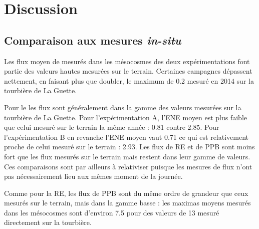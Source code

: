 \section{Discussion}

\subsection{Comparaison aux mesures \textit{in-situ}}

Les flux moyen de \chh mesurés dans les mésocosmes des deux expérimentations font partie des valeurs hautes mesurées sur le terrain.
Certaines campagnes dépassent nettement, en faisant plus que doubler, le maximum de \SI{0.2}{\uml} mesuré en 2014 sur la tourbière de La Guette.

Pour le \coo les flux sont généralement dans la gamme des valeurs mesurées sur la tourbière de La Guette.
Pour l'expérimentation A, l'ENE moyen est plus faible que celui mesuré sur le terrain la même année : \num{0.81} contre \SI{2.85}{\uml}.
Pour l'expérimentation B en revanche l'ENE moyen vaut \SI{0.71}{\uml} ce qui est relativement proche de celui mesuré sur le terrain : \SI{2.93}{\uml}.
Les flux de RE et de PPB sont moins fort que les flux mesurés sur le terrain mais restent dans leur gamme de valeurs.
Ces comparaisons sont par ailleurs à relativiser puisque les mesures de flux n'ont pas nécessairement lieu aux mêmes moment de la journée.


%
%
%


Comme pour la RE, les flux de PPB sont du même ordre de grandeur que ceux mesurés sur le terrain, mais dans la gamme basse : les maximas moyens mesurés dans les mésocosmes sont d'environ \num{7.5} pour des valeurs de \SI{13}{\uml} mesuré directement sur la tourbière.

